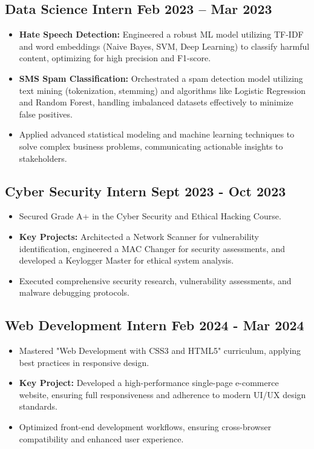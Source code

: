 \subsection{{Data Science Intern} \hfill Feb 2023 – Mar 2023}
\begin{itemize}
\item \textbf{Hate Speech Detection:} Engineered a robust ML model utilizing TF-IDF and word embeddings (Naive Bayes, SVM, Deep Learning) to classify harmful content, optimizing for high precision and F1-score.
\item \textbf{SMS Spam Classification:} Orchestrated a spam detection model utilizing text mining (tokenization, stemming) and algorithms like Logistic Regression and Random Forest, handling imbalanced datasets effectively to minimize false positives.
\item Applied advanced statistical modeling and machine learning techniques to solve complex business problems, communicating actionable insights to stakeholders.
\end{itemize}

\subsection{{Cyber Security Intern} \hfill Sept 2023 - Oct 2023}
\begin{itemize}
\item Secured Grade A+ in the Cyber Security and Ethical Hacking Course.
\item \textbf{Key Projects:} Architected a Network Scanner for vulnerability identification, engineered a MAC Changer for security assessments, and developed a Keylogger Master for ethical system analysis.
\item Executed comprehensive security research, vulnerability assessments, and malware debugging protocols.
\end{itemize}

\subsection{{Web Development Intern} \hfill Feb 2024 - Mar 2024}
\begin{itemize}
\item Mastered "Web Development with CSS3 and HTML5" curriculum, applying best practices in responsive design.
\item \textbf{Key Project:} Developed a high-performance single-page e-commerce website, ensuring full responsiveness and adherence to modern UI/UX design standards.
\item Optimized front-end development workflows, ensuring cross-browser compatibility and enhanced user experience.
\end{itemize}
